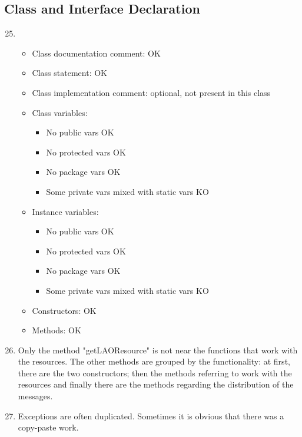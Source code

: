 \subsection{Class and Interface Declaration}
\begin{enumerate}
	\setcounter{enumi}{24}
	\item
	\begin{itemize}
		\item Class documentation comment: OK
		\item Class statement: OK
		\item Class implementation comment: optional, not present in this class
		\item Class variables:
		\begin{itemize}
			\item No public vars OK
			
			\item No protected vars OK
			
			\item No package vars OK
			
			\item Some private vars mixed with static vars \color{red}KO \color{black}
		\end{itemize}
		\item Instance variables:
		\begin{itemize}
			\item No public vars OK
			
			\item No protected vars OK
			
			\item No package vars OK
			
			\item Some private vars mixed with static vars \color{red}KO\color{black}
		\end{itemize}
		\item Constructors: OK
		\item Methods: OK
	\end{itemize}
	\item Only the method "getLAOResource" is not near the functions that work with the resources. The other methods are grouped by the functionality: at first, there are the two constructors; then the methods referring to work with the resources and finally there are the methods regarding the distribution of the messages.
	\item Exceptions are often duplicated. Sometimes it is obvious that there was a copy-paste work.
\end{enumerate}

